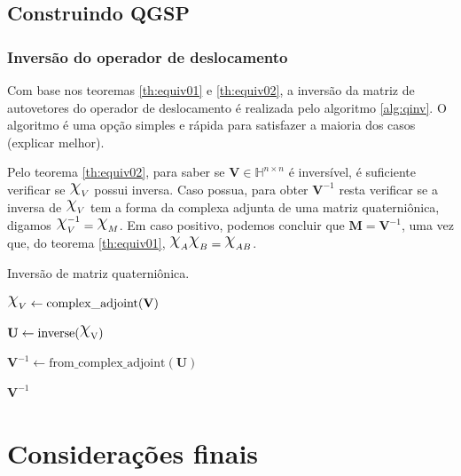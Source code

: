 \section{Construindo QGSP}

\subsection{Inversão do operador de deslocamento}

Com base nos teoremas \ref{th:equiv01} e \ref{th:equiv02}, a invers\~ao da matriz de autovetores do operador de deslocamento \'e realizada pelo algoritmo \ref{alg:qinv}. O algoritmo \'e uma op\c c\~ao simples e r\'apida para satisfazer a maioria dos casos (explicar melhor).

Pelo teorema \ref{th:equiv02}, para saber se $\mathbf{V} \in \mathbb{H}^{n \times n}$ \'e invers\'ivel, \'e suficiente verificar se $\rchi_{V}$ possui inversa. Caso possua, para obter $\mathbf{V}^{-1}$ resta verificar se a inversa de $\rchi_{V}$ tem a forma da complexa adjunta de uma matriz quaterni\^onica, digamos $\rchi_{V}^{-1} = \rchi_{M}$. Em caso positivo, podemos concluir que $\mathbf{M} = \mathbf{V}^{-1}$, uma vez que, do teorema \ref{th:equiv01}, $\rchi_{A} \rchi_{B} = \rchi_{AB}$.

\begin{algorithm}
\caption{Invers\~ao de matriz quaterni\^onica.}\label{alg:qinv}
$\rchi_{V} \gets \mathrm{complex\_adjoint(\mathbf{V})}$\;


$\mathbf{U} \gets \mathrm{inverse(\rchi_{V})}$


$\mathbf{V}^{-1} \gets \mathrm{from\_complex\_adjoint}(\mathbf{U})$

\Return $\mathbf{V}^{-1}$
\end{algorithm}

%
%

\chapter[Considera\c c\~oes finais]{Considera\c c\~oes finais}
\label{ch:others}

